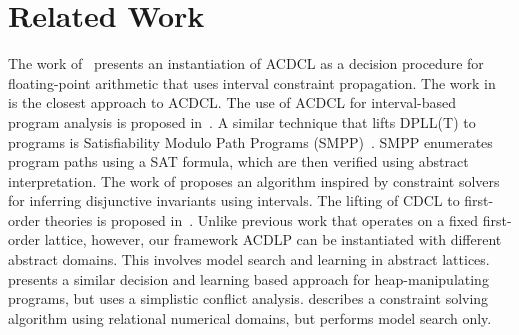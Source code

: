 \section{Related Work}
The work of~\cite{sas13,DBLP:journals/fmsd/BrainDGHK14} presents an
instantiation of ACDCL as a decision procedure for floating-point
arithmetic that uses interval constraint propagation.  The work 
in ~\cite{franzle} is the closest approach to ACDCL. 
%
The use of ACDCL for interval-based program analysis is 
proposed in~\cite{tacas12}.  
%
A similar technique that lifts DPLL(T) to
programs is Satisfiability Modulo Path Programs (SMPP)~\cite{SMPP}. SMPP
enumerates program paths using a SAT formula, which are then verified
using abstract interpretation.  
%
The work of \cite{DBLP:conf/esop/MineBR16} proposes an algorithm inspired by constraint
solvers for inferring disjunctive invariants using intervals.
%
The lifting of CDCL to first-order theories is proposed
in~\cite{dpll,cp09,ndsmt}.
%
 Unlike
previous work that operates on a fixed first-order lattice, however,
our framework ACDLP can be instantiated with different abstract domains.  This
involves model search and learning in abstract lattices.   
%
\cite{DBLP:journals/fmsd/BrainDGHK14} presents a similar decision and learning
based approach for heap-manipulating programs, but uses a simplistic conflict analysis.
%
\cite{DBLP:conf/vmcai/PelleauMTB13} describes a constraint solving algorithm
using relational numerical domains, but performs model search only.
%
%

